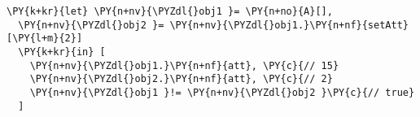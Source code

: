 \begin{Verbatim}[commandchars=\\\{\}]
\PY{k+kr}{let} \PY{n+nv}{\PYZdl{}obj1 }= \PY{n+no}{A}[],
  \PY{n+nv}{\PYZdl{}obj2 }= \PY{n+nv}{\PYZdl{}obj1.}\PY{n+nf}{setAtt}[\PY{l+m}{2}]
  \PY{k+kr}{in} [
    \PY{n+nv}{\PYZdl{}obj1.}\PY{n+nf}{att}, \PY{c}{// 15}
    \PY{n+nv}{\PYZdl{}obj2.}\PY{n+nf}{att}, \PY{c}{// 2}
    \PY{n+nv}{\PYZdl{}obj1 }!= \PY{n+nv}{\PYZdl{}obj2 }\PY{c}{// true}
  ]
\end{Verbatim}
